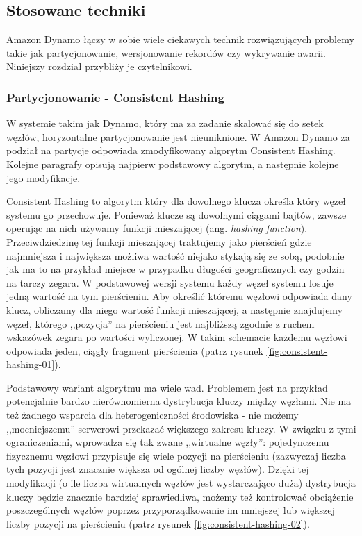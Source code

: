 \subsection*{Stosowane techniki}
\label{sec:dynamo-techniki}

Amazon Dynamo łączy w sobie wiele ciekawych technik rozwiązujących problemy takie jak partycjonowanie, wersjonowanie rekordów czy wykrywanie awarii.
Niniejszy rozdział przybliży je czytelnikowi.

\subsubsection*{Partycjonowanie - Consistent Hashing} 
\label{sec:dynamo-consistent-hashing}

W systemie takim jak Dynamo, który ma za zadanie skalować się do setek węzłów, horyzontalne partycjonowanie jest nieuniknione.
W Amazon Dynamo za podział na partycje odpowiada zmodyfikowany algorytm Consistent Hashing.
Kolejne paragrafy opisują najpierw podstawowy algorytm, a następnie kolejne jego modyfikacje.

Consistent Hashing to algorytm który dla dowolnego klucza określa który węzeł systemu go przechowuje.
Ponieważ klucze są dowolnymi ciągami bajtów, zawsze operując na nich używamy funkcji mieszającej (ang. \emph{hashing function}).
Przeciwdziedzinę tej funkcji mieszającej traktujemy jako pierścień gdzie najmniejsza i największa możliwa wartość niejako stykają się ze sobą, podobnie jak ma to na przykład miejsce w przypadku długości geograficznych czy godzin na tarczy zegara.
W podstawowej wersji systemu każdy węzeł systemu losuje jedną wartość na tym pierścieniu.
Aby określić któremu węzłowi odpowiada dany klucz, obliczamy dla niego wartość funkcji mieszającej, a następnie znajdujemy węzeł, którego ,,pozycja'' na pierścieniu jest najbliższą zgodnie z ruchem wskazówek zegara po wartości wyliczonej.
W takim schemacie każdemu węzłowi odpowiada jeden, ciągły fragment pierścienia (patrz rysunek \ref{fig:consistent-hashing-01}).


Podstawowy wariant algorytmu ma wiele wad.
Problemem jest na przykład potencjalnie bardzo nierównomierna dystrybucja kluczy między węzłami.
Nie ma też żadnego wsparcia dla heterogeniczności środowiska - nie możemy ,,mocniejszemu'' serwerowi przekazać większego zakresu kluczy.
W związku z tymi ograniczeniami, wprowadza się tak zwane ,,wirtualne węzły'': pojedynczemu fizycznemu węzłowi przypisuje się wiele pozycji na pierścieniu (zazwyczaj liczba tych pozycji jest znacznie większa od ogólnej liczby węzłów).
Dzięki tej modyfikacji (o ile liczba wirtualnych węzłów jest wystarczająco duża) dystrybucja kluczy będzie znacznie bardziej sprawiedliwa, możemy też kontrolować obciążenie poszczególnych węzłów poprzez przyporządkowanie im mniejszej lub większej liczby pozycji na pierścieniu (patrz rysunek \ref{fig:consistent-hashing-02}).

